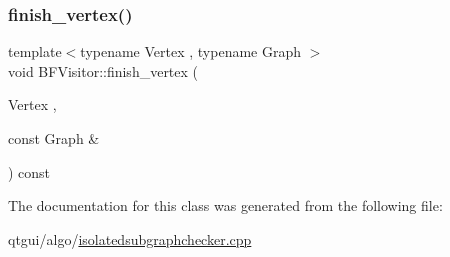 \mbox{\label{class_b_f_visitor_a0e9ab5693fef13695063135ae9a5b6c5}} 
\subsubsection{\texorpdfstring{finish\_vertex()}{finish\_vertex()}}
{\footnotesize\ttfamily template$<$typename Vertex , typename Graph $>$ \\
void B\+F\+Visitor\+::finish\+\_\+vertex (\begin{DoxyParamCaption}\item[{Vertex}]{,  }\item[{const Graph \&}]{ }\end{DoxyParamCaption}) const\hspace{0.3cm}{\ttfamily [inline]}}



The documentation for this class was generated from the following file\+:\begin{DoxyCompactItemize}
\item 
qtgui/algo/\mbox{\hyperlink{isolatedsubgraphchecker_8cpp}{isolatedsubgraphchecker.\+cpp}}\end{DoxyCompactItemize}
